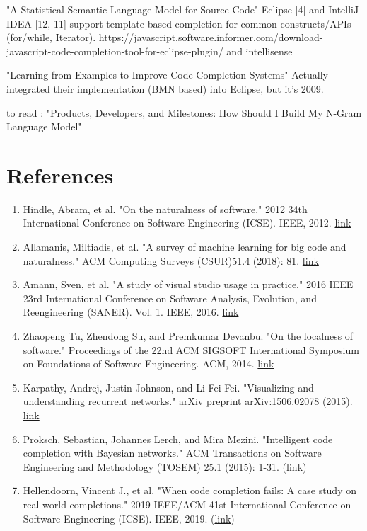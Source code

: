 "A Statistical Semantic Language Model for Source Code"
Eclipse [4] and IntelliJ IDEA [12, 11] support template-based completion for common
constructs/APIs (for/while, Iterator).
https://javascript.software.informer.com/download-javascript-code-completion-tool-for-eclipse-plugin/
and intellisense

"Learning from Examples to Improve Code Completion Systems"
Actually integrated their implementation (BMN based) into Eclipse, but it's 2009.

to read : "Products, Developers, and Milestones: How Should I Build My N-Gram Language Model"


\section{References}
\begin{enumerate}
	\item Hindle, Abram, et al. "On the naturalness of software." 2012 34th International Conference on Software Engineering (ICSE). IEEE, 2012. \href{http://citeseerx.ist.psu.edu/viewdoc/download?doi=10.1.1.221.1261&rep=rep1&type=pdf}{link}
	\item Allamanis, Miltiadis, et al. "A survey of machine learning for big code and naturalness." ACM Computing Surveys (CSUR)51.4 (2018): 81. \href{https://arxiv.org/pdf/1709.06182.pdf}{link}
	\item Amann, Sven, et al. "A study of visual studio usage in practice." 2016 IEEE 23rd International Conference on Software Analysis, Evolution, and Reengineering (SANER). Vol. 1. IEEE, 2016. \href{https://sarahnadi.org/resources/pubs/Amann_SANER16.pdf}{link}
	\item Zhaopeng Tu, Zhendong Su, and Premkumar Devanbu. "On the localness of software." Proceedings of the 22nd ACM SIGSOFT International Symposium on Foundations of Software Engineering. ACM, 2014. \href{http://zptu.net/papers/fse2014_localness.pdf}{link}
	\item Karpathy, Andrej, Justin Johnson, and Li Fei-Fei. "Visualizing and understanding recurrent networks." arXiv preprint arXiv:1506.02078 (2015). \href{https://arxiv.org/pdf/1506.02078.pdf}{link}
	\item Proksch, Sebastian, Johannes Lerch, and Mira Mezini. "Intelligent code completion with Bayesian networks." ACM Transactions on Software Engineering and Methodology (TOSEM) 25.1 (2015): 1-31. (\href{https://ieeexplore.ieee.org/stamp/stamp.jsp?arnumber=8812116}{link})
	\item Hellendoorn, Vincent J., et al. "When code completion fails: A case study on real-world completions." 2019 IEEE/ACM 41st International Conference on Software Engineering (ICSE). IEEE, 2019. (\href{https://dl.acm.org/doi/pdf/10.1145/2744200}{link})
\end{enumerate}